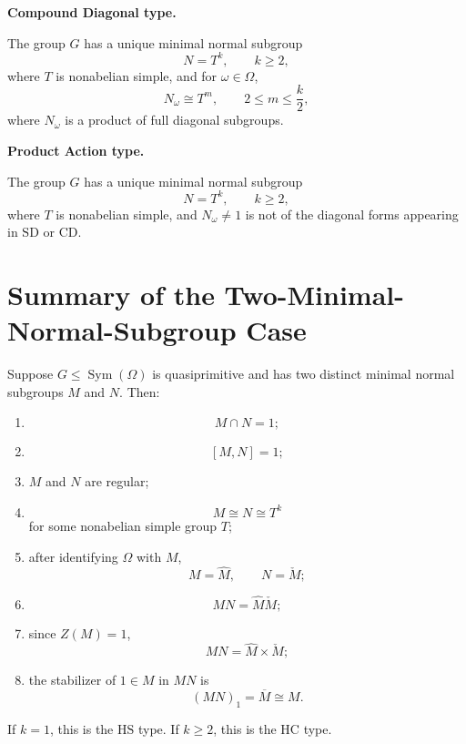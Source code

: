\begin{theorem}
\begin{description}[leftmargin=2.8cm, style=nextline]
    \item[\(\mathrm{CD}\)]
    \textbf{Compound Diagonal type.}

    The group \(G\) has a unique minimal normal subgroup
    \[
        N=T^k,\qquad k\geq 2,
    \]
    where \(T\) is nonabelian simple, and for \(\omega\in\Omega\),
    \[
        N_\omega\cong T^m,
        \qquad
        2\leq m\leq \frac{k}{2},
    \]
    where \(N_\omega\) is a product of full diagonal subgroups.

    \item[\(\mathrm{PA}\)]
    \textbf{Product Action type.}

    The group \(G\) has a unique minimal normal subgroup
    \[
        N=T^k,\qquad k\geq 2,
    \]
    where \(T\) is nonabelian simple, and \(N_\omega\neq 1\) is not of the diagonal forms
    appearing in \(\mathrm{SD}\) or \(\mathrm{CD}\).
\end{description}
\end{theorem}

\section{Summary of the Two-Minimal-Normal-Subgroup Case}

\begin{topic}
Suppose \(G\leq \operatorname{Sym}(\Omega)\) is quasiprimitive and has two distinct minimal
normal subgroups \(M\) and \(N\). Then:

\begin{enumerate}[label=(\arabic*)]
    \item
    \[
        M\cap N=1;
    \]

    \item
    \[
        [M,N]=1;
    \]

    \item \(M\) and \(N\) are regular;

    \item
    \[
        M\cong N\cong T^k
    \]
    for some nonabelian simple group \(T\);

    \item after identifying \(\Omega\) with \(M\),
    \[
        M=\widehat M,
        \qquad
        N=\check M;
    \]

    \item
    \[
        MN=\widehat M\check M;
    \]

    \item since \(Z(M)=1\),
    \[
        MN=\widehat M\times \check M;
    \]

    \item the stabilizer of \(1\in M\) in \(MN\) is
    \[
        (MN)_1=\overline M\cong M.
    \]
\end{enumerate}

If \(k=1\), this is the \(\mathrm{HS}\) type. If \(k\geq 2\), this is the \(\mathrm{HC}\) type.
\end{topic}